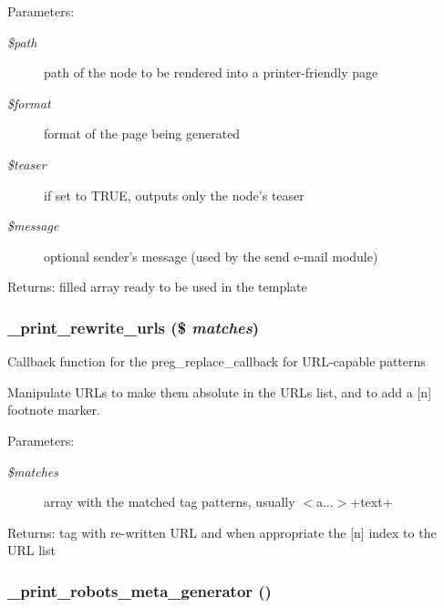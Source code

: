 \begin{Desc}
\item[Parameters:]
\begin{description}
\item[{\em \$path}]path of the node to be rendered into a printer-friendly page \item[{\em \$format}]format of the page being generated \item[{\em \$teaser}]if set to TRUE, outputs only the node's teaser \item[{\em \$message}]optional sender's message (used by the send e-mail module) \end{description}
\end{Desc}
\begin{Desc}
\item[Returns:]filled array ready to be used in the template \end{Desc}
\hypertarget{print_8pages_8inc_6e4a373faef7d99aa5bae041d6716b5e}{
\subsubsection[{\_\-print\_\-rewrite\_\-urls}]{\setlength{\rightskip}{0pt plus 5cm}\_\-print\_\-rewrite\_\-urls (\$ {\em matches})}}
\label{print_8pages_8inc_6e4a373faef7d99aa5bae041d6716b5e}


Callback function for the preg\_\-replace\_\-callback for URL-capable patterns

Manipulate URLs to make them absolute in the URLs list, and to add a \mbox{[}n\mbox{]} footnote marker.

\begin{Desc}
\item[Parameters:]
\begin{description}
\item[{\em \$matches}]array with the matched tag patterns, usually $<$a...$>$+text+ \end{description}
\end{Desc}
\begin{Desc}
\item[Returns:]tag with re-written URL and when appropriate the \mbox{[}n\mbox{]} index to the URL list \end{Desc}
\hypertarget{print_8pages_8inc_7bed1c6226e0320365d86f2ccae2343c}{
\subsubsection[{\_\-print\_\-robots\_\-meta\_\-generator}]{\setlength{\rightskip}{0pt plus 5cm}\_\-print\_\-robots\_\-meta\_\-generator ()}}
\label{print_8pages_8inc_7bed1c6226e0320365d86f2ccae2343c}


